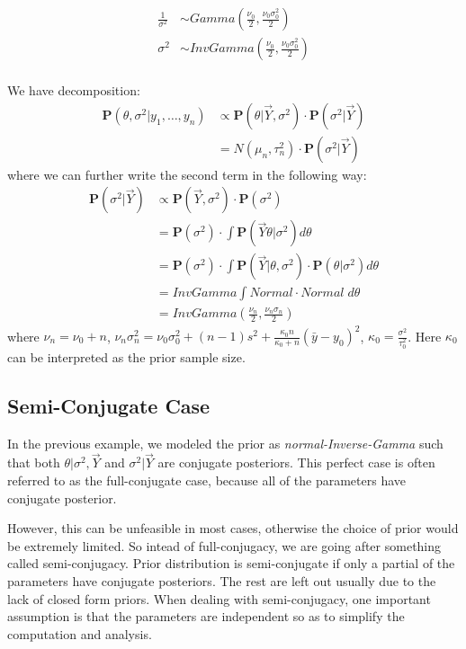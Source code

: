 \begin{align*}
    \frac{1}{\sigma^2} &\sim Gamma(\frac{\nu_0}{2}, \frac{\nu_0\sigma_0^2}{2}) \\
    \sigma^2 &\sim InvGamma(\frac{\nu_0}{2}, \frac{\nu_0\sigma_0^2}{2}) \\
\end{align*}

We have decomposition:
\begin{align*}
    \mathbf{P}(\theta, \sigma^2 | y_1, \ldots, y_n) &\propto \mathbf{P}(\theta | \vec{Y}, \sigma^2) \cdot \mathbf{P}(\sigma^2 | \vec{Y}) \\
    &= N(\mu_n, \tau_n^2) \cdot \mathbf{P}(\sigma^2 | \vec{Y})
\end{align*}
where we can further write the second term in the following way:
\begin{align*}
    \mathbf{P}(\sigma^2 | \vec{Y}) &\propto \mathbf{P}(\vec{Y}, \sigma^2) \cdot \mathbf{P}(\sigma^2) \\
    &= \mathbf{P}(\sigma^2) \cdot \int \mathbf{P}(\vec{Y} \theta | \sigma^2) d\theta \\
    &= \mathbf{P}(\sigma^2) \cdot \int \mathbf{P}(\vec{Y} | \theta, \sigma^2) \cdot \mathbf{P}(\theta | \sigma^2) d\theta \\
    &=InvGamma \int Normal \cdot Normal \;d\theta \\
    &= InvGamma(\frac{\nu_n}{2}, \frac{\nu_n\sigma_n}{2})
\end{align*}
where $\nu_n = \nu_0 + n$, $\nu_n\sigma_n^2 = \nu_0\sigma_0^2 + (n-1)s^2 + \frac{\kappa_0n}{\kappa_0 + n}(\bar{y} - y_0)^2$, $\kappa_0 = \frac{\sigma^2}{\tau_0^2}$. Here $\kappa_0$ can be interpreted as the prior sample size. 

\subsection*{Semi-Conjugate Case}
In the previous example, we modeled the prior as \emph{normal-Inverse-Gamma} such that both $\theta | \sigma^2, \vec{Y}$ and $\sigma^2 | \vec{Y}$ are conjugate posteriors. This perfect case is often referred to as the full-conjugate case, because all of the parameters have conjugate posterior. 

However, this can be unfeasible in most cases, otherwise the choice of prior would be extremely limited. So intead of full-conjugacy, we are going after something called semi-conjugacy. Prior distribution is semi-conjugate if only a partial of the parameters have conjugate posteriors. The rest are left out usually due to the lack of closed form priors. When dealing with semi-conjugacy, one important assumption is that the parameters are independent so as to simplify the computation and analysis.

